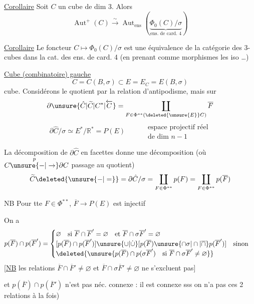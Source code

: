 \uline{Corollaire} Soit $C$ un cube de dim 3. Alors
\[
\operatorname{Aut}^+(C)\xrightarrow{\sim}\operatorname{Aut}_{\mathrm{ens}}(\underbrace{\Phi_0(C)/\sigma}_{\text{ens. de card. 4}})
\]

\uline{Corollaire} Le foncteur $C\longmapsto\Phi_0(C)/\sigma$ est une équivalence de la catégorie des 3-cubes  dans  la cat. des ens. de card. 4 (en prenant comme morphismes les iso \ldots)

\uline{Cube (combinatoire) gauche}
\[
C=C(B,\sigma)\subset E=E_C=E(B,\sigma)
\]
cube. Considérons le quotient par la relation d'antipodisme, mais sur
\[
\partial\unsure{\hat C|\widetilde C|C^*|\overleftarrow C}=\coprod_{F\in\Phi^{**}(\deleted{\unsure{E}}C)}\overline F
\]
\[
\partial\hat C/\sigma\simeq E^*/\mathbb R^*=P(E)\qquad
\begin{aligned}&\text{espace projectif réel}\\&\text{de dim }n-1\end{aligned}
\]

La décomposition de $\partial\hat C$ en facettes donne une décomposition (où $C\overset{p}{\unsure{-|\to}}\partial C$ passage au quotient)
\[
\widetilde C\deleted{\unsure{-|=}}=\partial\hat C/\sigma
=\coprod_{F\in\Phi^{**}}p(F)=\coprod_{F\in\Phi^{**}}p(\overline F)
\]

NB Pour tte $F\in\Phi^{**}$, $\overline F\to P(E)$ est injectif

On a 
\[
p(\overline F)\cap p(\overline F')=
\begin{cases}
\varnothing\quad\text{si }\overline F\cap\overline F'=\varnothing\quad\text{et }\overline F\cap\sigma\overline F'=\varnothing\\
[p(\overline F)\cap p(\overline F')]\unsure{\cup|\mathbin{\dot\cup}}
[p(\overline F)\unsure{\cap\sigma|\cap|\overline{\cap}}p(\overline F')]\quad\text{sinon}\\
\deleted{\unsure{p(\overline F)\cap p(\sigma\overline F')\quad\text{si }\overline F\cap\sigma\overline F'\ne\varnothing}}
\end{cases}
\]
[\uline{NB} les relations $\overline F\cap\overline F'\ne\varnothing$ et $\overline F\cap\sigma\overline F'\ne\varnothing$ ne s'excluent pas]


et $p(\overline F)\cap p(\overline F')$ n'est pas néc. connexe : il est connexe sss  on n'a pas ces 2 relations à la fois)
